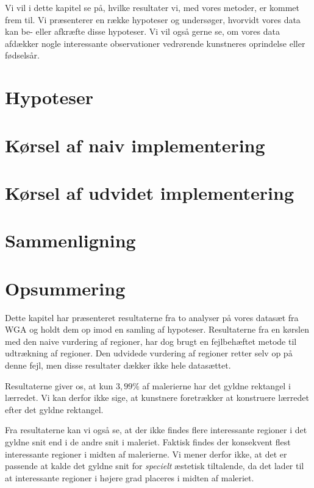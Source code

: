 {
{\sffamily Vi vil i dette kapitel se på, hvilke resultater vi, med vores
metoder, er kommet frem til. Vi præsenterer en række hypoteser og
undersøger, hvorvidt vores data kan be- eller afkræfte disse hypoteser.
Vi vil også gerne se, om vores data afdækker nogle interessante
observationer vedrørende kunstneres oprindelse eller fødselsår.
}

\section{Hypoteser}


\section{Kørsel af naiv implementering\label{section_naiv_koersel}}

\clearpage

\section{Kørsel af udvidet implementering\label{section_udvidet_koersel}}


\section{Sammenligning\label{section_samlede_resultater}}


\section*{Opsummering}
Dette kapitel har præsenteret resultaterne fra to analyser på vores
datasæt fra WGA og holdt dem op imod en samling af hypoteser.
Resultaterne fra en kørslen med den naive vurdering af regioner, har dog
brugt en fejlbehæftet metode til udtrækning af regioner.  Den udvidede
vurdering af regioner retter selv op på denne fejl, men disse resultater
dækker ikke hele datasættet.

Resultaterne giver os, at kun $3,99 \%$ af malerierne har det
gyldne rektangel i lærredet. Vi kan derfor ikke sige, at kunstnere
foretrækker at konstruere lærredet efter det gyldne rektangel.

Fra resultaterne kan vi også se, at der ikke findes flere interessante
regioner i det gyldne snit end i de andre snit i maleriet. Faktisk
findes der konsekvent flest interessante regioner i midten af
malerierne. Vi mener derfor ikke, at det er passende at kalde det gyldne
snit for \emph{specielt} æstetisk tiltalende, da det lader til at
interessante regioner i højere grad placeres i midten af maleriet.

}
